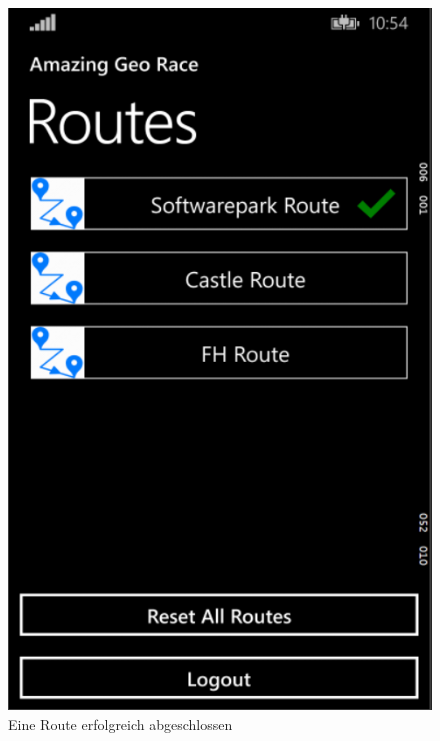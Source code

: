 \documentclass[a4paper,ngerman]{scrartcl}
\begin{document}
\begin{figure}[h]
\centering
\includegraphics[width=.95\textwidth]{images/routePage_SucceededRoute}
\caption{Eine Route erfolgreich abgeschlossen}
\end{figure}
\end{document}

